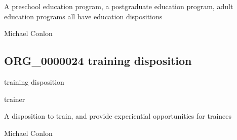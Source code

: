 \documentclass[letterpaper,10pt,english]{sphinxmanual}
\begin{document}
\begin{sphinxShadowBox}

\sphinxAtStartPar
A pre\sphinxhyphen{}school education program, a post\sphinxhyphen{}graduate education program, adult education programs all have education dispositions
\end{sphinxShadowBox}

\begin{sphinxShadowBox}

\sphinxAtStartPar
Michael Conlon 
\end{sphinxShadowBox}
\begin{quote}

\ignorespaces \end{quote}


\subsection{ORG\_0000024 \sphinxhyphen{} training disposition}
\label{\detokenize{doc-ORG_0000024:org-0000024-training-disposition}}\label{\detokenize{doc-ORG_0000024:index-0}}\label{\detokenize{doc-ORG_0000024::doc}}
\begin{sphinxShadowBox}

\sphinxAtStartPar
training disposition
\end{sphinxShadowBox}

\begin{sphinxShadowBox}

\sphinxAtStartPar
trainer
\end{sphinxShadowBox}

\begin{sphinxShadowBox}

\sphinxAtStartPar
A disposition to train, and provide experiential opportunities for trainees
\end{sphinxShadowBox}

\begin{sphinxShadowBox}

\sphinxAtStartPar
Michael Conlon 
\end{sphinxShadowBox}
\end{document}
